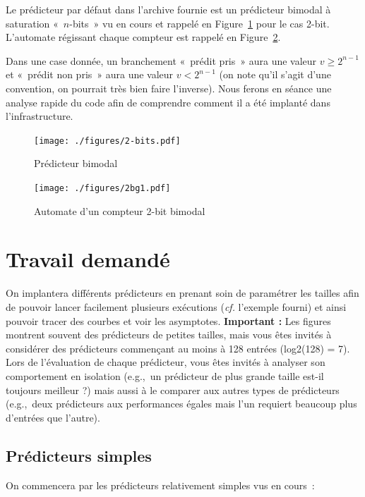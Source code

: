 \documentclass[a4paper]{article}
\begin{document}
Le prédicteur par défaut dans l'archive fournie est un prédicteur bimodal à saturation «~$n$-bits~» vu en cours et rappelé en Figure~\ref{2-bit} pour le cas 2-bit. L'automate régissant chaque compteur est rappelé en Figure~\ref{bimod}.

Dans une case donnée, un branchement «~prédit pris~» aura une valeur $v\geq 2^{n-1}$ et «~prédit non pris~» aura une valeur $v<2^{n-1}$ (on note qu'il s'agit d'une convention, on pourrait très bien faire l'inverse). Nous ferons en séance une analyse rapide du code afin de comprendre comment il a été implanté dans l'infrastructure.

\begin{figure}[htb]
      \center\texttt{[image: ./figures/2-bits.pdf]}
      \caption{Prédicteur bimodal}
      \label{2-bit}
\end{figure}

\begin{figure}[htb]
	\center\texttt{[image: ./figures/2bg1.pdf]}
	\caption{Automate d'un compteur 2-bit bimodal}
	\label{bimod}
\end{figure}

\section{Travail demandé} 
On implantera différents prédicteurs en prenant soin de paramétrer les tailles afin de pouvoir lancer facilement plusieurs exécutions (\emph{cf.} l'exemple fourni) et ainsi pouvoir tracer des courbes et voir les asymptotes. \textbf{Important :} Les figures montrent souvent des prédicteurs de petites tailles, mais vous êtes invités à considérer des prédicteurs commençant au moins à 128 entrées (log2(128) = 7). Lors de l'évaluation de chaque prédicteur, vous êtes invités à analyser son comportement en isolation (e.g.,~un prédicteur de plus grande taille est-il toujours meilleur ?) mais aussi à le comparer aux autres types de prédicteurs (e.g.,~deux prédicteurs aux performances égales mais l'un requiert beaucoup plus d'entrées que l'autre).

\subsection{Prédicteurs simples}

On commencera par les prédicteurs relativement simples vus en cours~:
\end{document}
